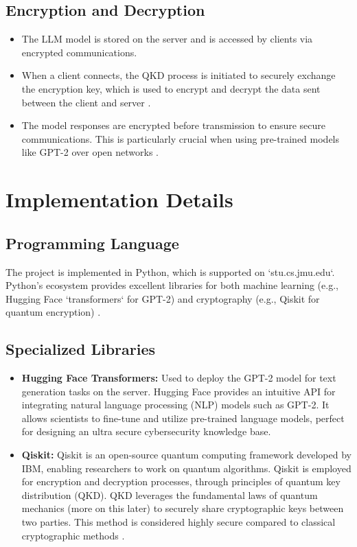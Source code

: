 \documentclass{article}
\begin{document}
\subsection{Encryption and Decryption}
\begin{itemize}
    \item The LLM model is stored on the server and is accessed by clients via encrypted communications.
    \item When a client connects, the QKD process is initiated to securely exchange the encryption key, which is used to encrypt and decrypt the data sent between the client and server \parencite{patel2020, nielsen2010}.
    \item The model responses are encrypted before transmission to ensure secure communications. This is particularly crucial when using pre-trained models like GPT-2 over open networks \parencite{huggingface_gpt2_model_2024, mlabonne_llm_course_2024}.
\end{itemize}

\section{Implementation Details}

\subsection{Programming Language}
The project is implemented in Python, which is supported on `stu.cs.jmu.edu`. Python's ecosystem provides excellent libraries for both machine learning (e.g., Hugging Face `transformers` for GPT-2) and cryptography (e.g., Qiskit for quantum encryption) \parencite{nielsen2010, tanenbaum2020, huggingface_gpt2_model_2024}.

\subsection{Specialized Libraries}
\begin{itemize}
    \item \textbf{Hugging Face Transformers:} Used to deploy the GPT-2 model for text generation tasks on the server. Hugging Face provides an intuitive API for integrating natural language processing (NLP) models such as GPT-2. It allows scientists to fine-tune and utilize pre-trained language models, perfect for designing an ultra secure cybersecurity knowledge base\parencite{huggingface_llm_2024, jalammar_gpt2_illustration_2024}.
    
    \item \textbf{Qiskit:} Qiskit is an open-source quantum computing framework developed by IBM, enabling researchers to work on quantum algorithms. Qiskit is employed for encryption and decryption processes, through principles of quantum key distribution (QKD). QKD leverages the fundamental laws of quantum mechanics (more on this later) to securely share cryptographic keys between two parties. This method is considered highly secure compared to classical cryptographic methods \parencite{bennett1984, lo2012, nsa2024}.
\end{itemize}
\end{document}
